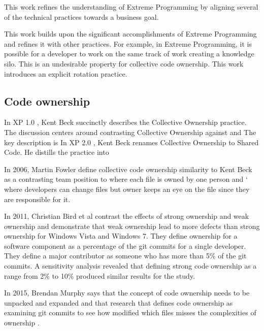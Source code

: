 This work refines the understanding of Extreme Programming by aligning several of the technical practices towards a business goal. 

This work builds upon the significant accomplishments of Extreme Programming and refines it with other practices. For example, in Extreme Programming, it is possible for a developer to work on the same track of work creating a knowledge silo. This is an undesirable property for collective code ownership. This work introduces an explicit rotation practice.

\subsection{Code ownership}
In XP 1.0 \cite{ExtremeProgramming2000}, Kent Beck succinctly describes the Collective Ownership practice. The discussion centers around contrasting Collective Ownership against  and  The key description is  In XP 2.0 \cite{ExtremeProgramming2004}, Kent Beck renames Collective Ownership to Shared Code. He distills the practice into  

In 2006, Martin Fowler define collective code ownership similarity to Kent Beck \cite{FowlerCodeOwnership} as a contrasting team position to  where each file is owned by one person and ` where developers can change files but owner keeps an eye on the file since they are responsible for it. 

In 2011, Christian Bird et al \cite{BirdDontTouchMyCode} contrast the effects of strong ownership and weak ownership and demonstrate that weak ownership lead to more defects than strong ownership for Windows Vista and Windows 7. They define ownership for a software component as a percentage of the git commits for a single developer. They define a major contributor as someone who has more than 5\% of the git commits. A sensitivity analysis revealed that defining strong code ownership as a range from 2\% to 10\% produced similar results for the study.

In 2015, Brendan Murphy says that the concept of code ownership needs to be unpacked and expanded and that research that defines code ownership as examining git commits to see how modified which files misses the complexities of ownership \cite{MurphyIEEESoftware}.

